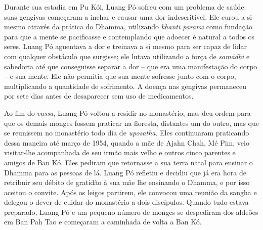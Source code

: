Durante sua estadia em Pu Kói, Luang Pó sofreu com um problema de saúde:
suas gengivas começaram a inchar e causar uma dor indescritível. Ele
curou a si mesmo através da prática do Dhamma, utilizando \emph{khanti
pāramī} como fundação para que a mente se pacificasse e contemplando que
adoecer é natural a todos os seres. Luang Pó aguentava a dor e treinava
a si mesmo para ser capaz de lidar com qualquer obstáculo que surgisse;
ele lutava utilizando a força de \emph{samādhi} e sabedoria até que
conseguisse separar a dor -- que era uma manifestação do corpo -- e sua
mente. Ele não permitia que sua mente sofresse junto com o corpo,
multiplicando a quantidade de sofrimento. A doença nas gengivas
permaneceu por sete dias antes de desaparecer sem uso de medicamentos.

Ao fim do \emph{vassa}, Luang Pó voltou a residir no monastério, mas deu
ordem para que os demais monges fossem praticar na floresta, distantes
um do outro, mas que se reunissem no monastério todo dia de
\emph{uposatha}. Eles continuaram praticando dessa maneira até março de
1954, quando a mãe de Ajahn Chah, Mé Pim, veio visitar-lhe acompanhada
de seu irmão mais velho e outros cinco parentes e amigos de Ban Kó. Eles
pediram que retornasse a sua terra natal para ensinar o Dhamma para as
pessoas de lá. Luang Pó refletiu e decidiu que já era hora de retribuir
seu débito de gratidão à sua mãe lhe ensinando o Dhamma, e por isso
aceitou o convite. Após os leigos partirem, ele convocou uma reunião da
sangha e delegou o dever de cuidar do monastério a dois discípulos.
Quando tudo estava preparado, Luang Pó e um pequeno número de monges se
despediram dos aldeões em Ban Pah Tao e começaram a caminhada de volta a
Ban Kó.
